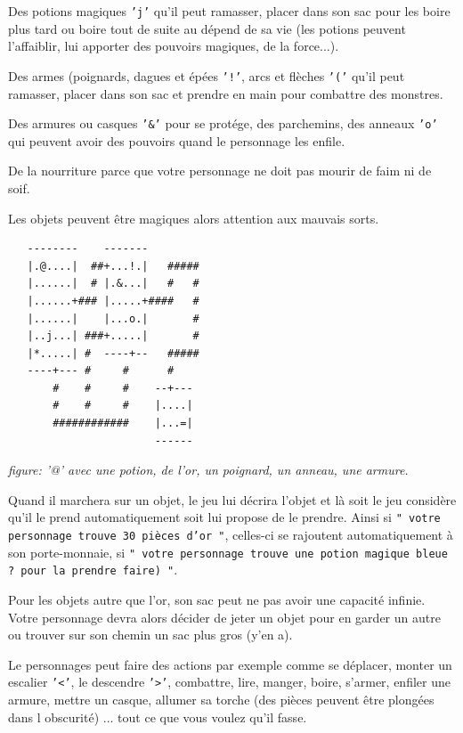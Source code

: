 \documentclass{article}
\begin{document}
Des potions magiques \texttt{'j'} qu'il peut ramasser, placer dans son
sac pour les boire plus tard ou boire tout de suite au dépend de sa
vie (les potions peuvent l'affaiblir, lui apporter des pouvoirs
magiques, de la force...).

Des armes (poignards, dagues et épées \texttt{'!'}, arcs et flèches
\texttt{'('} qu'il peut ramasser, placer dans son sac et prendre en
main pour combattre des monstres.

Des armures ou casques \texttt{'\&'} pour se protége, des parchemins,
des anneaux \texttt{'o'} qui peuvent avoir des pouvoirs quand le
personnage les enfile.

De la nourriture parce que votre personnage ne doit pas mourir de faim
ni de soif.

Les objets peuvent être magiques alors attention aux mauvais sorts.

\begin{verbatim}
   --------    -------
   |.@....|  ##+...!.|   #####
   |......|  # |.&...|   #   #
   |......+### |.....+####   #
   |......|    |...o.|       #
   |..j...| ###+.....|       #
   |*.....| #  ----+--   #####
   ----+--- #     #      #
       #    #     #    --+---
       #    #     #    |....|
       ############    |...=|
                       ------
\end{verbatim}
\begin{center}
  \textit{figure: '@' avec une potion, de l'or, un poignard, un anneau, une armure.}
\end{center}

\vspace{.3cm}

Quand il marchera sur un objet, le jeu lui décrira l'objet et là soit
le jeu considère qu'il le prend automatiquement soit lui propose de le
prendre. Ainsi si \texttt{" votre personnage trouve 30 pièces d'or "},
celles-ci se rajoutent automatiquement à son porte-monnaie, si
\texttt{" votre personnage trouve une potion magique bleue ? pour la
  prendre faire) "}.

Pour les objets autre que l'or, son sac peut ne pas avoir une capacité
infinie. Votre personnage devra alors décider de jeter un objet pour
en garder un autre ou trouver sur son chemin un sac plus gros (y'en
a).

\vspace{.3cm}

Le personnages peut faire des actions par exemple comme se déplacer, monter
un escalier \texttt{'<'}, le descendre \texttt{'>'}, combattre, lire,
manger, boire, s'armer, enfiler une armure, mettre un casque, allumer
sa torche (des pièces peuvent être plongées dans l obscurité) ...
tout ce que vous voulez qu'il fasse.
\end{document}
